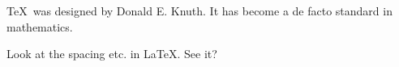 \documentclass{article}
\begin{document}
\TeX\ was designed by Donald E. Knuth.
It has become a de facto standard in mathematics.

Look at the spacing etc. in  LaTeX. See it?
\end{document}
